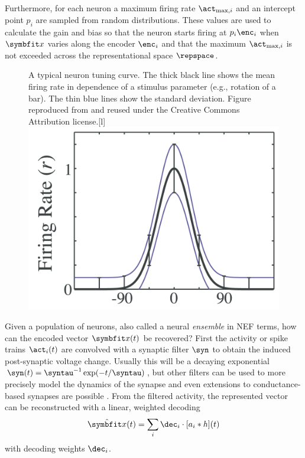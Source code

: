 Furthermore, for each neuron a maximum firing rate $\act_{\max, i}$ and an intercept point $p_i$ are sampled from random distributions.
These values are used to calculate the gain and bias so that the neuron starts firing at $p_i \enc_i$ when $\vc x$ varies along the encoder $\enc_i$ and that the maximum $\act_{\max,i}$ is not exceeded across the representational space $\repspace$.
\begin{figure}
    \begin{captionbeside}{A typical neuron tuning curve. The thick black line shows the mean firing rate in dependence of a stimulus parameter (e.g., rotation of a bar). The thin blue lines show the standard deviation. Figure reproduced from \textcite{butts2006} and reused under the Creative Commons Attribution license.\label{fig:tuningcurve}}[l]
        \includegraphics{figures/tuningcurve}
    \end{captionbeside}
\end{figure}

Given a population of neurons, also called a neural \emph{ensemble} in NEF terms, how can the encoded vector $\vc x(t)$ be recovered?
First the activity or spike trains $\act_i(t)$ are convolved with a synaptic filter $\syn$ to obtain the induced post-synaptic voltage change.
Usually this will be a decaying exponential $\syn(t) = \syntau^{-1}\exp(-t / \syntau)$, but other filters can be used to more precisely model the dynamics of the synapse \parencite{voelker2017a} and even extensions to conductance-based synapses are possible \parencite{stockel2017}.
From the filtered activity, the represented vector can be reconstructed with a linear, weighted decoding
\begin{equation}
    \hat{\vc x}(t) = \sum_i \dec_i \cdot \sbr{a_i * h}\!(t)
\end{equation}
with decoding weights $\dec_i$.

